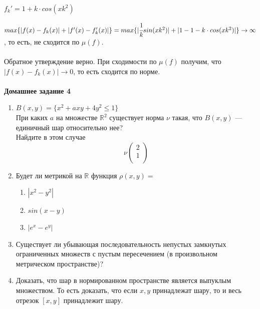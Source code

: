 \documentclass[a4paper,12pt]{article}
\begin{document}
\begin{defintion}
\begin{center}
	$f_k' = 1+k \cdot cos(xk^2)$\end{center}
$max \{|f(x)-f_k(x)|+|f'(x)-f_k'(x)|\} = max \{|\cfrac{1}{k}sin(xk^2)|+|1-1-k\cdot cos(xk^2)|\} \to \infty$, то есть, не сходится по $\mu(f)$.\\ \\
Обратное утверждение верно. При сходимости по $\mu(f)$ получим, что $|f(x)-f_k(x)|\to 0$, то есть сходится по норме.\\ \\
\noindent \textbf{Домашнее задание 4}\begin{enumerate}
	\item
	$B(x, y) = \{x^2+axy+4y^2 \leqslant 1\}$\\
	При каких $a$ на множестве $\mathbb{R}^2$ существует норма $\nu$ такая, что $B(x, y)$ --- единичный шар относительно нее? \\Найдите в этом случае
	\[\nu \begin{pmatrix}
	2 \\
	1\\
	\end{pmatrix}\]
	\item
	Будет ли метрикой на $\mathbb{R}$ функция $\rho(x, y) =$\begin{enumerate}
		\item $|x^2-y^2|$
		\item $sin(x-y)$
		\item $|e^x-e^y|$
	\end{enumerate}
	\item
	Существует ли убывающая последовательность непустых замкнутых ограниченных множеств с пустым пересечением (в произвольном метрическом пространстве)?
	\item
	Доказать, что шар в нормированном пространстве является выпуклым множеством. То есть доказать, что если $x, y$ принадлежат шару, то и весь отрезок $[x, y]$ принадлежит шару.\end{enumerate}

\end{defintion}
\end{document}
